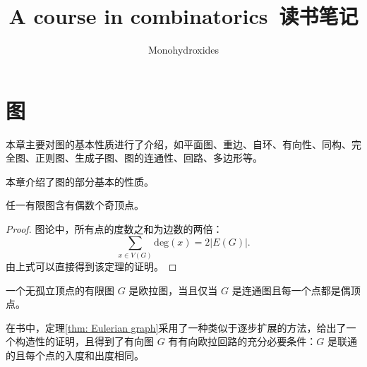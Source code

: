 \documentclass[cn,hazy,sakura,14pt,normal]{elegantnote}
\title{A course in combinatorics\ 读书笔记}
\author{Monohydroxides}
\date{\zhtoday}
\begin{document}
\maketitle

\newpage

\section{图}

本章主要对图的基本性质进行了介绍，如平面图、重边、自环、有向性、同构、完全图、正则图、生成子图、图的连通性、回路、多边形等。

本章介绍了图的部分基本的性质。

\begin{theorem} \label{thm: First theorem of graph theory}
    任一有限图含有偶数个奇顶点。
\end{theorem}

\begin{proof}
    图论中，所有点的度数之和为边数的两倍：
    \begin{equation}
    \sum_{x \in V(G)} \text{deg}(x) = 2 \left| E(G) \right|.
    \end{equation}
    由上式可以直接得到该定理的证明。
\end{proof}

\begin{theorem} \label{thm: Eulerian graph}
    一个无孤立顶点的有限图 $G$ 是欧拉图，当且仅当 $G$ 是连通图且每一个点都是偶顶点。
\end{theorem}

在书中，定理\ref{thm: Eulerian graph}采用了一种类似于逐步扩展的方法，给出了一个构造性的证明，且得到了有向图 $G$ 有有向欧拉回路的充分必要条件：$G$ 是联通的且每个点的入度和出度相同。

\nocite{*}
\printbibliography[heading=bibintoc, title=\ebibname]
\end{document}
